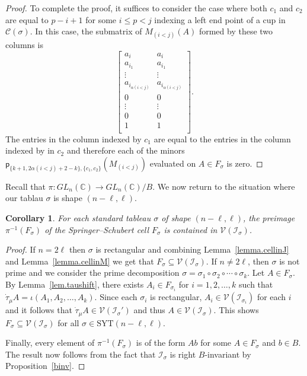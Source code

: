 \documentclass[11pt]{amsart}
\newtheorem{corollary}[theorem]{Corollary}
\theoremstyle{remark}
\theoremstyle{remark}
\theoremstyle{definition}
\theoremstyle{definition}
\theoremstyle{definition}
\numberwithin{equation}{section}
\newcommand{\C}{\mathbb{C}}           %
\newcommand{\ga}{\alpha}
\newcommand{\gs}{\sigma}
\newcommand{\cc}{\mathcal{C}}
\newcommand{\ci}{\mathcal{I}}
\newcommand{\cv}{\mathcal{V}}
\newcommand{\SYT}{\mathrm{SYT}}
\newcommand{\pl}{\mathsf{p}}
\newcommand{\cupsigma}{\cc(\gs)}
\newcommand{\cell}{F_\gs}
\begin{document}
\begin{proof}
To complete the proof, it suffices to consider the case where both $c_1$ and $c_2$ are equal to $p-i+1$ for some $i\leq p<j$ indexing a left end point of a cup in $\cupsigma$. In this case, the submatrix of $M_{(i<j)}(A)$ formed by these two columns is 
\[
\begin{bmatrix}
    a_{i} & a_{i}\\
    a_{i_1}& a_{i_1}\\
    \vdots& \vdots \\
    a_{i_{\ga(i<j)}}&a_{i_{\ga(i<j)}} \\
    0& 0\\
    \vdots&\vdots \\
    0& 0\\
    1& 1 \\
\end{bmatrix}.
\]
The entries in the column indexed by $c_1$ are equal to the entries in the column indexed by in $c_2$ and therefore each of the minors $\pl_{\{k+1,2\ga(i<j)+2-k\},\{c_1,c_2\}}(M_{(i<j)})$ evaluated on $A\in \cell$ is zero.
\end{proof}

Recall that $\pi: GL_n(\C) \to GL_n(\C)/B$. We now return to the situation where our tablau $\gs$ is shape $(n-\ell, \ell)$. 

\begin{corollary} \label{cor.cellinI}
For each standard tableau $\gs$ of shape $(n-\ell, \ell)$, the preimage $\pi^{-1}(\cell)$ of the Springer--Schubert cell $\cell$ is contained in $\cv(\ci_\gs)$. 
\end{corollary}
\begin{proof} If $n= 2\ell$ then $\gs$ is rectangular and combining Lemma~\ref{lemma.cellinJ} and Lemma~\ref{lemma.cellinM} we get that $\cell\subseteq \cv(\ci_\gs)$.  If $n\neq 2\ell$, then $\gs$ is not prime and we consider the prime decomposition $\gs=\gs_1\circ \gs_2 \circ \cdots \circ \gs_k$. Let $A\in \cell$. By Lemma~\ref{lem.taushift}, there exists $A_i\in F_{\gs_i}$ for $i=1,2,\ldots, k$ such that $\dot\tau_\mu A = \iota(A_1, A_2, \ldots, A_k)$. Since each $\gs_i$ is rectangular, $A_i\in \cv(\ci_{\gs_i})$ for each $i$ and it follows that $\dot\tau_\mu A \in \cv(\ci_\gs')$ and thus $A\in \cv(\ci_{\gs})$. This shows $\cell \subseteq \cv(\ci_\gs)$ for all $\gs\in \SYT(n-\ell, \ell)$.


Finally, every element of $\pi^{-1}(\cell)$ is of the form $Ab$ for some $A\in \cell$ and $b\in B$. The result now follows from the fact that $\ci_\gs$ is right $B$-invariant by Proposition~\ref{binv}. 
\end{proof}
\end{document}

